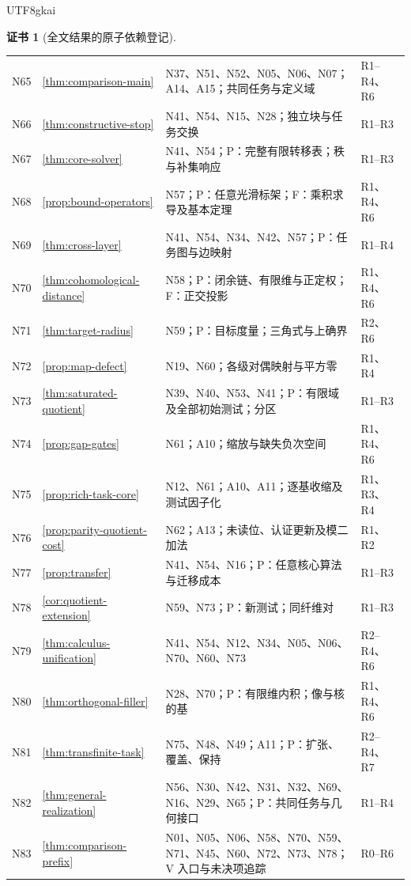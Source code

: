 \documentclass[12pt]{report}
\theoremstyle{definition}
\newtheorem{Certificate}{证书}[chapter]
\begin{document}
\begin{CJK*}{UTF8}{gkai}
\begin{Certificate}[全文结果的原子依赖登记]
\begin{longtable}{p{}p{}p{}p{}}
N65 & \ref{thm:comparison-main} & N37、N51、N52、N05、\newline N06、N07；A14、A15；共同任务与定义域 & R1--R4、R6\\
N66 & \ref{thm:constructive-stop} & N41、N54、N15、N28；独立块与任务交换 & R1--R3\\
N67 & \ref{thm:core-solver} & N41、N54；P：完整有限转移表；秩与补集响应 & R1--R3\\
N68 & \ref{prop:bound-operators} & N57；P：任意光滑标架；F：乘积求导及基本定理 & R1、R4、R6\\
N69 & \ref{thm:cross-layer} & N41、N54、N34、N42、N57；P：任务图与边映射 & R1--R4\\
N70 & \ref{thm:cohomological-distance} & N58；P：闭余链、有限维与正定权；F：正交投影 & R1、R4、R6\\
N71 & \ref{thm:target-radius} & N59；P：目标度量；三角式与上确界 & R2、R6\\
N72 & \ref{prop:map-defect} & N19、N60；各级对偶映射与平方零 & R1、R4\\
N73 & \ref{thm:saturated-quotient} & N39、N40、N53、N41；P：有限域及全部初始测试；分区 & R1--R3\\
N74 & \ref{prop:gap-gates} & N61；A10；缩放与缺失负次空间 & R1、R4、R6\\
N75 & \ref{prop:rich-task-core} & N12、N61；A10、A11；逐基收缩及测试因子化 & R1、R3、R4\\
N76 & \ref{prop:parity-quotient-cost} & N62；A13；未读位、认证更新及模二加法 & R1、R2\\
N77 & \ref{prop:transfer} & N41、N54、N16；P：任意核心算法与迁移成本 & R1--R3\\
N78 & \ref{cor:quotient-extension} & N59、N73；P：新测试；同纤维对 & R1--R3\\
N79 & \ref{thm:calculus-unification} & N41、N54、N12、N34、N05、\newline N06、N70、N60、N73 & R2--R4、R6\\
N80 & \ref{thm:orthogonal-filler} & N28、N70；P：有限维内积；像与核的基 & R1、R4、R6\\
N81 & \ref{thm:transfinite-task} & N75、N48、N49；A11；P：扩张、覆盖、保持 & R2--R4、R7\\
N82 & \ref{thm:general-realization} & N56、N30、N42、N31、\newline N32、N69、N16、N29、\newline N65；P：共同任务与几何接口 & R1--R4\\
N83 & \ref{thm:comparison-prefix} & N01、N05、N06、N58、\newline N70、N59、N71、N45、\newline N60、N72、N73、N78；V 入口与未决项追踪 & R0--R6\\

\end{longtable}
\end{Certificate}
\end{CJK*}
\end{document}
